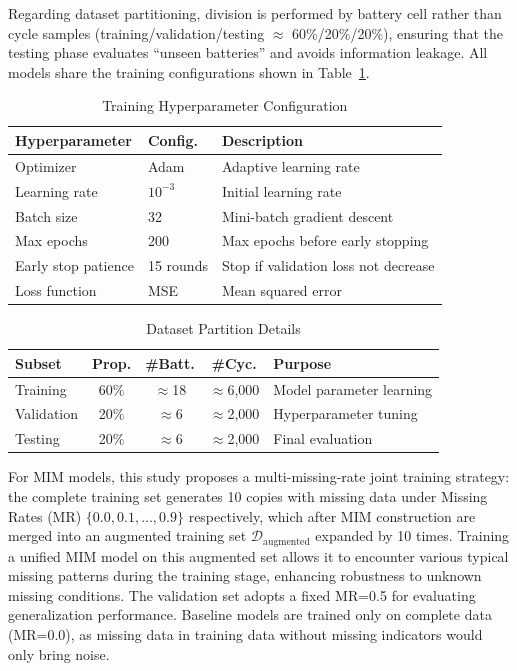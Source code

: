 \documentclass[5p,times]{elsarticle}
\begin{document}
Regarding dataset partitioning, division is performed by battery cell rather than cycle samples (training/validation/testing $\approx$ 60\%/20\%/20\%), ensuring that the testing phase evaluates ``unseen batteries'' and avoids information leakage. All models share the training configurations shown in Table~\ref{tab:training_config}.

\begin{table}[t]
\centering
\footnotesize
\caption{Training Hyperparameter Configuration}
\label{tab:training_config}
\begin{tabular}{@{}lp{2cm}p{3.5cm}@{}}
\toprule
\textbf{Hyperparameter} & \textbf{Config.} & \textbf{Description} \\
\midrule
Optimizer & Adam & Adaptive learning rate \\
Learning rate & $10^{-3}$ & Initial learning rate \\
Batch size & 32 & Mini-batch gradient descent \\
Max epochs & 200 & Max epochs before early stopping \\
Early stop patience & 15 rounds & Stop if validation loss not decrease \\
Loss function & MSE & Mean squared error \\
\bottomrule
\end{tabular}
\end{table}

\begin{table}[t]
\centering
\footnotesize
\caption{Dataset Partition Details}
\label{tab:data_split}
\begin{tabular}{@{}lcccp{2.8cm}@{}}
\toprule
\textbf{Subset} & \textbf{Prop.} & \textbf{\#Batt.} & \textbf{\#Cyc.} & \textbf{Purpose} \\
\midrule
Training & 60\% & $\approx$18 & $\approx$6,000 & Model parameter learning \\
Validation & 20\% & $\approx$6 & $\approx$2,000 & Hyperparameter tuning \\
Testing & 20\% & $\approx$6 & $\approx$2,000 & Final evaluation \\
\bottomrule
\end{tabular}
\end{table}

For MIM models, this study proposes a multi-missing-rate joint training strategy: the complete training set generates 10 copies with missing data under Missing Rates (MR) $\{0.0, 0.1, \ldots, 0.9\}$ respectively, which after MIM construction are merged into an augmented training set $\mathcal{D}_{\text{augmented}}$ expanded by 10 times. Training a unified MIM model on this augmented set allows it to encounter various typical missing patterns during the training stage, enhancing robustness to unknown missing conditions. The validation set adopts a fixed MR=0.5 for evaluating generalization performance. Baseline models are trained only on complete data (MR=0.0), as missing data in training data without missing indicators would only bring noise.
\end{document}
